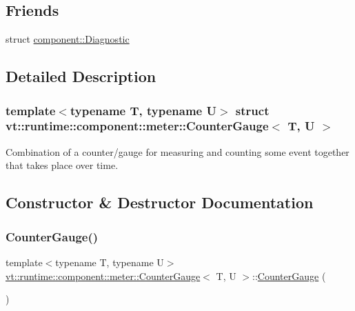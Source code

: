 \subsection*{Friends}
\begin{DoxyCompactItemize}
\item 
struct \hyperlink{structvt_1_1runtime_1_1component_1_1meter_1_1_counter_gauge_a48f263de9dbf26c1fc7736031cca9613}{component\+::\+Diagnostic}
\end{DoxyCompactItemize}


\subsection{Detailed Description}
\subsubsection*{template$<$typename T, typename U$>$\newline
struct vt\+::runtime\+::component\+::meter\+::\+Counter\+Gauge$<$ T, U $>$}

Combination of a counter/gauge for measuring and counting some event together that takes place over time. 

\subsection{Constructor \& Destructor Documentation}
\mbox{\label{structvt_1_1runtime_1_1component_1_1meter_1_1_counter_gauge_a22b5d98866d327cd9c353f7cd38677a4}} 
\subsubsection{\texorpdfstring{Counter\+Gauge()}{CounterGauge()}\hspace{0.1cm}{\footnotesize\ttfamily [1/2]}}
{\footnotesize\ttfamily template$<$typename T, typename U$>$ \\
\hyperlink{structvt_1_1runtime_1_1component_1_1meter_1_1_counter_gauge}{vt\+::runtime\+::component\+::meter\+::\+Counter\+Gauge}$<$ T, U $>$\+::\hyperlink{structvt_1_1runtime_1_1component_1_1meter_1_1_counter_gauge}{Counter\+Gauge} (\begin{DoxyParamCaption}{ }\end{DoxyParamCaption})\hspace{0.3cm}{\ttfamily [default]}}



